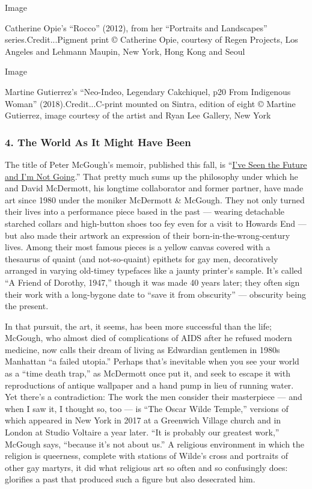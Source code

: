 Image

Catherine Opie's ``Rocco'' (2012), from her ``Portraits and Landscapes''
series.Credit...Pigment print © Catherine Opie, courtesy of Regen
Projects, Los Angeles and Lehmann Maupin, New York, Hong Kong and Seoul

Image

Martine Gutierrez's ``Neo-Indeo, Legendary Cakchiquel, p20 From
Indigenous Woman'' (2018).Credit...C-print mounted on Sintra, edition of
eight © Martine Gutierrez, image courtesy of the artist and Ryan Lee
Gallery, New York

\hypertarget{4-the-world-as-it-might-have-been}{%
\subsubsection{4. The World As It Might Have
Been}\label{4-the-world-as-it-might-have-been}}

The title of Peter McGough's memoir, published this fall, is
``\href{https://www.penguinrandomhouse.com/books/561291/ive-seen-the-future-and-im-not-going-by-peter-mcgough/}{I've
Seen the Future and I'm Not Going}.'' That pretty much sums up the
philosophy under which he and David McDermott, his longtime collaborator
and former partner, have made art since 1980 under the moniker McDermott
\& McGough. They not only turned their lives into a performance piece
based in the past --- wearing detachable starched collars and
high-button shoes too fey even for a visit to Howards End --- but also
made their artwork an expression of their born-in-the-wrong-century
lives. Among their most famous pieces is a yellow canvas covered with a
thesaurus of quaint (and not-so-quaint) epithets for gay men,
decoratively arranged in varying old-timey typefaces like a jaunty
printer's sample. It's called ``A Friend of Dorothy, 1947,'' though it
was made 40 years later; they often sign their work with a long-bygone
date to ``save it from obscurity'' --- obscurity being the present.

In that pursuit, the art, it seems, has been more successful than the
life; McGough, who almost died of complications of AIDS after he refused
modern medicine, now calls their dream of living as Edwardian gentlemen
in 1980s Manhattan ``a failed utopia.'' Perhaps that's inevitable when
you see your world as a ``time death trap,'' as McDermott once put it,
and seek to escape it with reproductions of antique wallpaper and a hand
pump in lieu of running water. Yet there's a contradiction: The work the
men consider their masterpiece --- and when I saw it, I thought so, too
--- is ``The Oscar Wilde Temple,'' versions of which appeared in New
York in 2017 at a Greenwich Village church and in London at Studio
Voltaire a year later. ``It is probably our greatest work,'' McGough
says, ``because it's not about us.'' A religious environment in which
the religion is queerness, complete with stations of Wilde's cross and
portraits of other gay martyrs, it did what religious art so often and
so confusingly does: glorifies a past that produced such a figure but
also desecrated him.

